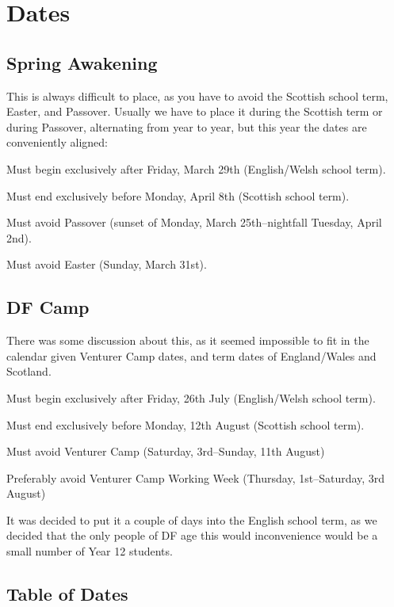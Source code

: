 \documentclass[a4paper, 12pt]{article}
\begin{document}
\section{Dates}
\subsection{Spring Awakening}
This is always difficult to place, as you have to avoid the Scottish school term, Easter, and Passover. Usually we have to place it during the Scottish term or during Passover, alternating from year to year, but this year the dates are conveniently aligned:
\begin{itemize*}
	\item Must begin exclusively after Friday, March 29th (English/Welsh school term).
	\item Must end exclusively before Monday, April 8th (Scottish school term).
	\item Must avoid Passover (sunset of Monday, March 25th--nightfall Tuesday, April 2nd).
	\item Must avoid Easter (Sunday, March 31st).
\end{itemize*}

\subsection{DF Camp}
There was some discussion about this, as it seemed impossible to fit in the calendar given Venturer Camp dates, and term dates of England/Wales and Scotland.
\begin{itemize*}
	\item Must begin exclusively after Friday, 26th July (English/Welsh school term).
	\item Must end exclusively before Monday, 12th August (Scottish school term).
	\item Must avoid Venturer Camp (Saturday, 3rd--Sunday, 11th August)
	\item Preferably avoid Venturer Camp Working Week (Thursday, 1st--Saturday, 3rd August)
\end{itemize*}
It was decided to put it a couple of days into the English school term, as we decided that the only people of DF age this would inconvenience would be a small number of Year 12 students.

\subsection{Table of Dates}
\end{document}
